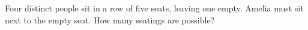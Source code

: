 Four distinct people sit in a row of five seats, leaving one empty. Amelia must sit next to the empty seat. How many seatings are possible?
